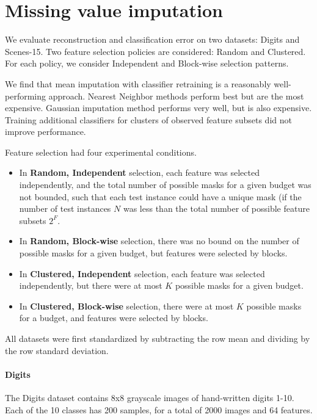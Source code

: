 \chapter{Missing value imputation}\label{sec:imputation_evaluation}

We evaluate reconstruction and classification error on two datasets: Digits and Scenes-15.
Two feature selection policies are considered: Random and Clustered.
For each policy, we consider Independent and Block-wise selection patterns.

We find that mean imputation with classifier retraining is a reasonably well-performing approach.
Nearest Neighbor methods perform best but are the most expensive.
Gaussian imputation method performs very well, but is also expensive.
Training additional classifiers for clusters of observed feature subsets did not improve performance.

Feature selection had four experimental conditions.
\begin{itemize}
\item In \textbf{Random, Independent} selection, each feature was selected independently, and the total number of possible masks for a given budget was not bounded, such that each test instance could have a unique mask (if the number of test instances $N$ was less than the total number of possible feature subsets $2^F$.
\item In \textbf{Random, Block-wise} selection, there was no bound on the number of possible masks for a given budget, but features were selected by blocks.
\item In \textbf{Clustered, Independent} selection, each feature was selected independently, but there were at most $K$ possible masks for a given budget.
\item In \textbf{Clustered, Block-wise} selection, there were at most $K$ possible masks for a budget, and features were selected by blocks.
\end{itemize}

All datasets were first standardized by subtracting the row mean and dividing by the row standard deviation.

\subsubsection{Digits}
The Digits dataset contains 8x8 grayscale images of hand-written digits 1-10.
Each of the 10 classes has 200 samples, for a total of 2000 images and 64 features.

